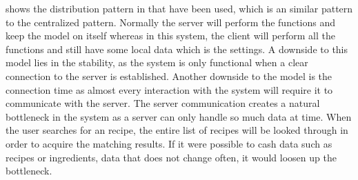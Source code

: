  shows the distribution pattern in that have been used, which is an similar pattern to the centralized pattern. Normally the server will perform the functions and keep the model on itself whereas in this system, the client will perform all the functions and still have some local data which is the settings. A downside to this model lies in the stability, as the system is only functional when a clear connection to the server is established. Another downside to the model is the connection time as almost every interaction with the system will require it to communicate with the server. The server communication creates a natural bottleneck in the system as a server can only handle so much data at time. When the user searches for an recipe, the entire list of recipes will be looked through in order to acquire the matching results. If it were possible to cash data such as recipes or ingredients, data that does not change often, it would loosen up the bottleneck.